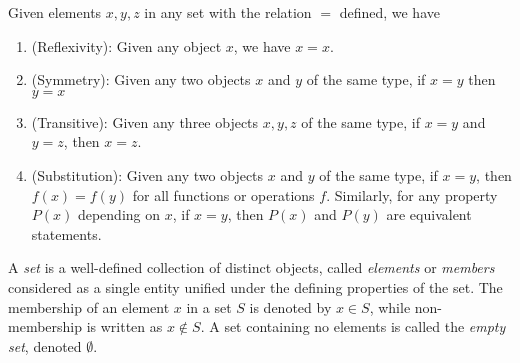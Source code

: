 \documentclass[../main.tex]{subfiles}
\begin{document}
\begin{definition}\label{def:equivalence_relation}
Given elements $x,y,z$ in any set with the relation $=$ defined, we have
\begin{enumerate}
    \item (Reflexivity): Given any object $x$, we have $ x = x$.
    \item (Symmetry): Given any two objects $x$ and $y$ of the same type, if $x=y$ then $y=x$
    \item (Transitive): Given any three objects $x, y, z$ of the same type, if $ x = y$ and $y=z$, then $x=z$. 
    \item (Substitution): Given any two objects $x$ and $y$ of the same type, if $ x = y$, then $ f(x) = f(y) $ for all functions or operations $f$. Similarly, for any property $ P(x) $ depending on $x$, if $x=y$, then $P(x)$ and $P(y)$ are equivalent statements. 
\end{enumerate}
\end{definition}



\begin{definition}\label{def:set}
A \textit{set} is a well-defined collection of distinct objects, called \textit{elements} or \textit{members} considered as a single entity unified under the defining properties of the set. The membership of an element \( x \) in a set \( S \) is denoted by \( x \in S \), while non-membership is written as \( x \notin S \). A set containing no elements is called the \textit{empty set}, denoted \( \emptyset \). 
\end{definition}
\end{document}
